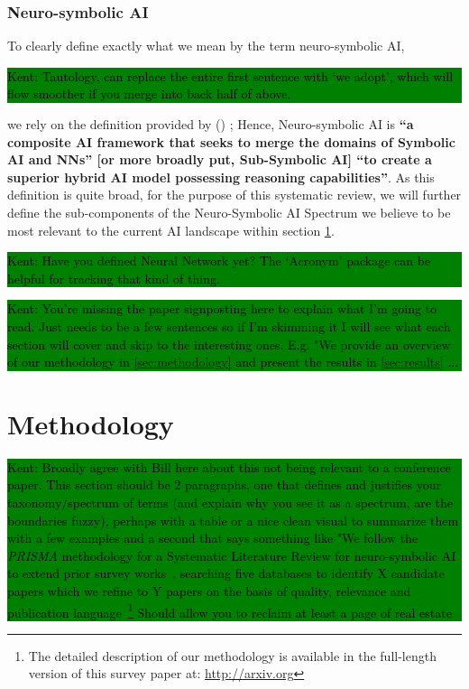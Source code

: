 \documentclass[hf]{ceurart}
\newcommand{\citeauthornum}[1]{\citeauthor{#1} (\citeyear{#1}) \cite{#1}}
\newcommand{\pinaforecomment}[4]{\colorbox{#1}{\textcolor{#4}{\parbox{.8\linewidth}{#2: #3}}}}
\newcommand{\osullikomment}[1]{\pinaforecomment{green}{Kent}{#1}{black}}
\begin{document}
\subsubsection{\textbf{Neuro-symbolic AI}}
To clearly define exactly what we mean by the term neuro-symbolic AI, 
%
\osullikomment{Tautology, can replace the entire first sentence with `we adopt', which will flow smoother if you merge into back half of above.}
%
we rely on the definition provided by \citeauthornum{Garcez2023}; Hence, Neuro-symbolic AI is \textbf{\enquote{a composite AI framework that seeks to merge the domains of Symbolic AI and NNs} [or more broadly put, Sub-Symbolic AI] \enquote{to create a superior hybrid AI model possessing reasoning capabilities}}. As this definition is quite broad, for the purpose of this systematic review, we will further define the sub-components of the Neuro-Symbolic AI Spectrum we believe to be most relevant to the current AI landscape within section \ref{sec:methodology}. 
\osullikomment{Have you defined Neural Network yet? The `Acronym' package can be helpful for tracking that kind of thing.}

\osullikomment{You're missing the paper signposting here to explain what I'm going to read. Just needs to be a few sentences so if I'm skimming it I will see what each section will cover and skip to the interesting ones. E.g. "We provide an overview of our methodology in \autoref{sec:methodology} and present the results in \autoref{sec:results} ... }

\section{Methodology}\label{sec:methodology}

\osullikomment{Broadly agree with Bill here about this not being relevant to a conference paper. This section should be 2 paragraphs, one that defines and justifies your taxonomy/spectrum of terms (and explain why you see it as a spectrum, are the boundaries fuzzy), perhaps with a table or a nice clean visual to summarize them with a few examples and a second that says something like "We follow the \textit{PRISMA} methodology for a Systematic Literature Review for neuro-symbolic AI to extend prior survey works~\cite{Gibaut2023,Yu2021,Wan2024,Marra2024,MichelDeletie2024,Bouneffouf2022}, searching five databases to identify X candidate papers which we refine to Y papers on the basis of quality, relevance and publication language~\footnote{The detailed description of our methodology is available in the full-length version of this survey paper at: \url{http://arxiv.org}} Should allow you to reclaim at least a page of real estate}
\end{document}
